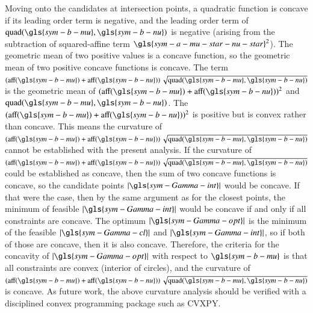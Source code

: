 Moving onto the candidates at intersection points, a quadratic function is concave if its leading order term is negative, and the leading order term of $\textrm{quad}(\gls{sym-b-mu}, \gls{sym-b-nu})$ is negative (arising from the subtraction of squared-affine term $\gls{sym-a-mu-star-nu-star}^2$).
The geometric mean of two positive values is a concave function, so the geometric mean of two positive concave functions is concave.
The term $\left(\textrm{aff}(\gls{sym-b-mu}) + \textrm{aff}(\gls{sym-b-nu})\right) \sqrt{\textrm{quad}(\gls{sym-b-mu}, \gls{sym-b-nu})}$
is the geometric mean of $(\textrm{aff}(\gls{sym-b-mu})+\textrm{aff}(\gls{sym-b-nu}))^2$ and $\textrm{quad}(\gls{sym-b-mu}, \gls{sym-b-nu})$.
The $(\textrm{aff}(\gls{sym-b-mu})+\textrm{aff}(\gls{sym-b-nu}))^2$ is positive but is convex rather than concave.
This means the curvature of $\left(\textrm{aff}(\gls{sym-b-mu}) + \textrm{aff}(\gls{sym-b-nu})\right) \sqrt{\textrm{quad}(\gls{sym-b-mu}, \gls{sym-b-nu})}$ cannot be established with the present analysis.
If the curvature of $\left(\textrm{aff}(\gls{sym-b-mu}) + \textrm{aff}(\gls{sym-b-nu})\right) \sqrt{\textrm{quad}(\gls{sym-b-mu}, \gls{sym-b-nu})}$ could be established as concave,
then the sum of two concave functions is concave, so the candidate points $|\gls{sym-Gamma-int}|$ would be concave.
If that were the case, then by the same argument as for the closest points, the minimum of feasible $|\gls{sym-Gamma-int}|$ would be concave if and only if all constraints are concave.
The optimum $|\gls{sym-Gamma-opt}|$ is the minimum of the feasible $|\gls{sym-Gamma-cl}|$ and $|\gls{sym-Gamma-int}|$, so if both of those are concave, then it is also concave.
Therefore, the criteria for the concavity of $|\gls{sym-Gamma-opt}|$ with respect to $\gls{sym-b-mu}$ is that all constraints are convex (interior of circles), and the curvature of $\left(\textrm{aff}(\gls{sym-b-mu}) + \textrm{aff}(\gls{sym-b-nu})\right) \sqrt{\textrm{quad}(\gls{sym-b-mu}, \gls{sym-b-nu})}$ is concave.
As future work, the above curvature analysis should be verified with a disciplined convex programming package such as CVXPY.

